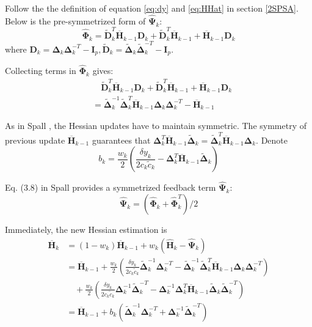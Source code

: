 \documentclass[conference]{IEEEtran}
\newcommand{\bD}{\bm{D}}
\newcommand{\bI}{\bm{I}}
\newcommand{\bDelta}{\bm{\Delta}}
\newcommand{\oH}{\bm{\overline{H}}}
\newcommand{\hH}{\bm{\hat{H}}}
\newcommand{\hPsi}{\bm{\hat{\Psi}}}
\newcommand{\hPhi}{\bm{\hat{\Phi}}}
\newcommand{\tDelta}{\bm{\tilde{\Delta}}}
\newcommand{\tD}{\bm{\tilde{D}}}
\begin{document}
Follow the the definition of equation \ref{eq:dy} and \ref{eq:HHat} in section \ref{2SPSA}. Below is the pre-symmetrized form of $ \hPsi_k $:
\begin{equation}
	\hPhi_k=\tD_k^T\oH_{k-1}\bD_k+\tD_k^T\oH_{k-1}+\oH_{k-1}\bD_k
\end{equation}
where $ \bD_k=\bDelta_k\bDelta_k^{-T}-\bI_p, \tD_k=\tDelta_k\tDelta_k^{-T}-\bI_p $.

Collecting terms in $\hPhi_k$ gives:
\begin{align*}
&\quad\tD_k^T\oH_{k-1}\bD_k+\tD_k^T\oH_{k-1}+\oH_{k-1}\bD_k\\
&=\tDelta_k^{-1}\tDelta_k^{T}\oH_{k-1}\bDelta_k\bDelta_k^{-T}-\oH_{k-1}
\end{align*}

As in Spall \cite{Spall2009}, the Hessian updates have to maintain symmetric. The symmetry of previous update $ \oH_{k-1}$ guarantees that $\bDelta_k^{T}\oH_{k-1}\tDelta_k=\tDelta_k^{T}\oH_{k-1}\bDelta_k$. Denote
\begin{equation}
b_k=\frac{w_k}{2}(\frac{\delta y_k}{2c_k\tilde{c}_k}-\bDelta_k^{T}\oH_{k-1}\tDelta_k)
\end{equation}

Eq. (3.8) in Spall \cite{Spall2009} provides a symmetrized feedback term $ \hPsi_k $:
\begin{equation} \label{eq:PsiHat}
\hPsi_k =(\hPhi_k+\hPhi_k^T)/2
\end{equation}

Immediately, the new Hessian estimation is
\begin{align*}
\oH_k&=(1-w_k)\oH_{k-1}+w_k(\hH_k-\hPsi_k)\\
&=\oH_{k-1}+\frac{w_k}{2}(\frac{\delta y_k}{2c_k\tilde{c}_k}\tDelta_k^{-1}\bDelta_k^{-T}-\tDelta_k^{-1}\tDelta_k^{T}\oH_{k-1}\bDelta_k\bDelta_k^{-T})\\
&\quad +\frac{w_k}{2}(\frac{\delta y_k}{2c_k\tilde{c}_k}\bDelta_k^{-1}\tDelta_k^{-T}-\bDelta_k^{-1}\bDelta_k^{T}\oH_{k-1}\tDelta_k\tDelta_k^{-T})\\
&=\oH_{k-1}+b_k(\tDelta_k^{-1}\bDelta_k^{-T}+\bDelta_k^{-1}\tDelta_k^{-T})
\end{align*}
\end{document}
